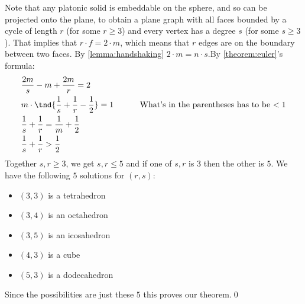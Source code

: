 \begin{prf}
    Note that any platonic solid is embeddable on the sphere, and so can be projected onto the plane, to obtain a plane graph with all faces bounded by a cycle of length $r$ (for some $r \geq 3$) and every vertex has a degree $s$ (for some $s \geq 3$). That implies that $r \cdot f = 2 \cdot m$, which means that $r$ edges are on the boundary between two faces. By \ref{lemma:handshaking} $2 \cdot m = n \cdot s$.By \ref{theorem:euler}'s formula:
    \begin{align*}
        &\frac{2m}{s} - m + \frac{2m}{r} = 2 \\
        &m \cdot \tnd{\frac{1}{s} + \frac{1}{r} - \frac{1}{2}} = 1 \text{\hspace{1cm} What's in the parentheses has to be $< 1$} \\
        &\frac{1}{s} + \frac{1}{r} = \frac{1}{m} + \frac{1}{2} \\
        &\frac{1}{s} + \frac{1}{r} > \frac{1}{2}
    \end{align*}
    Together $s, r \geq 3$, we get $s, r \leq 5$ and if one of $s, r$ is $3$ then the other is $5$. We have the following $5$ solutions for $(r, s)$:
    \begin{itemize}
        \item $(3, 3)$ is a tetrahedron
        \item $(3, 4)$ is an octahedron
        \item $(3, 5)$ is an icosahedron
        \item $(4, 3)$ is a cube
        \item $(5, 3)$ is a dodecahedron
    \end{itemize}
    Since the possibilities are just these $5$ this proves our theorem.\qed
\end{prf}
